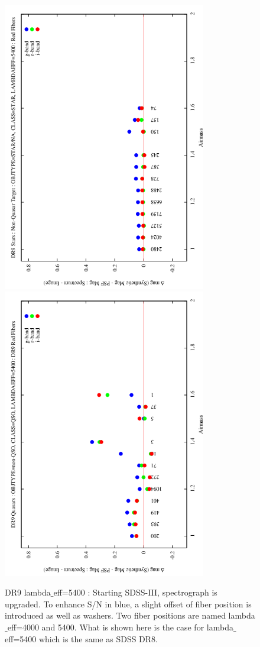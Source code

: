 \documentclass[apj,twocolumn]{aastex631}
\begin{document}
\begin{figure}%
\begin{center}
\includegraphics[angle=270,width=8.9cm]{figures/120821_02_airmass_vs_dmag_star_dr9_redfiber.png}
\includegraphics[angle=270,width=8.9cm]{figures/120821_05_airmass_vs_dmag_quasar_dr9_redfibers.png}
\caption{DR9 lambda$\_$eff=5400 : Starting SDSS-III, spectrograph is upgraded.  To enhance S/N in blue, a slight offset of fiber position is introduced as well as washers.  Two fiber positions are named lambda$\_$eff=4000 and 5400.  What is shown here is the case for lambda$\_$eff=5400 which is the same as SDSS DR8.}
\end{center}
\end{figure}
\end{document}
